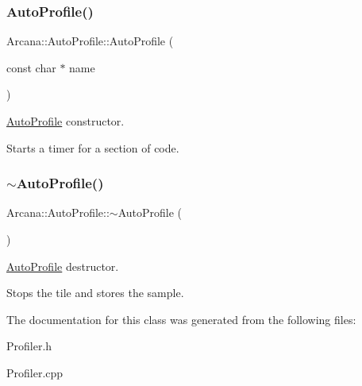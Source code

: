 \subsubsection{\texorpdfstring{Auto\+Profile()}{AutoProfile()}}
{\footnotesize\ttfamily Arcana\+::\+Auto\+Profile\+::\+Auto\+Profile (\begin{DoxyParamCaption}\item[{const char $\ast$}]{name }\end{DoxyParamCaption})}



\mbox{\hyperlink{class_arcana_1_1_auto_profile}{Auto\+Profile}} constructor. 

Starts a timer for a section of code. \mbox{\label{class_arcana_1_1_auto_profile_a16d83f6aa209f34c19661969f2717e19}} 
\subsubsection{\texorpdfstring{$\sim$\+Auto\+Profile()}{~AutoProfile()}}
{\footnotesize\ttfamily Arcana\+::\+Auto\+Profile\+::$\sim$\+Auto\+Profile (\begin{DoxyParamCaption}{ }\end{DoxyParamCaption})}



\mbox{\hyperlink{class_arcana_1_1_auto_profile}{Auto\+Profile}} destructor. 

Stops the tile and stores the sample. 

The documentation for this class was generated from the following files\+:\begin{DoxyCompactItemize}
\item 
Profiler.\+h\item 
Profiler.\+cpp\end{DoxyCompactItemize}
